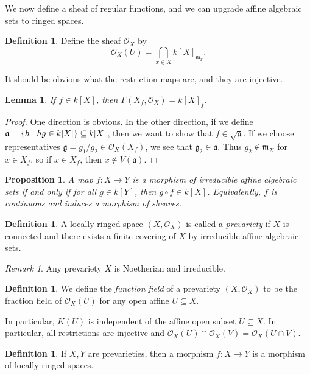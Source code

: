 \documentclass[leqno, openany]{memoir}
\newtheorem{prop}[thm]{Proposition}
\newtheorem{lem}[thm]{Lemma}
\theoremstyle{definition}
\newtheorem{defn}[thm]{Definition}
\theoremstyle{remark}
\newtheorem{rmk}[thm]{Remark}
\theoremstyle{plain}
\theoremstyle{definition}
\theoremstyle{remark}
\newcommand{\mf}[1]{\mathfrak{#1}}
\newcommand{\msc}[1]{\mathscr{#1}}
\begin{document}
We now define a sheaf of regular functions, and we can upgrade affine algebraic sets to ringed spaces.

\begin{defn}
    Define the sheaf $\msc{O}_X$ by
    \[ \msc{O}_X(U) = \bigcap_{x \in X} {k[X]}_{\mf{m}_x}. \]
\end{defn}
It should be obvious what the restriction maps are, and they are injective.

\begin{lem}
    If $f \in k[X]$, then $\Gamma(X_f, \msc{O}_X) = {k[X]}_f$.
\end{lem}

\begin{proof}
    One direction is obvious. In the other direction, if we define $\mf{a} = \qty{h \mid h g \in k[X]} \subseteq k[X]$, then we want to show that $f \in \sqrt{\mf{a}}$. If we choose representatives $\mf{g} = g_1 / g_2 \in \msc{O}_X(X_f)$, we see that $\mf{g}_2 \in \mf{a}$. Thus $g_2 \notin \mf{m}_X$ for $x \in X_f$, so if $x \in X_f$, then $x \notin V(\mf{a})$.
\end{proof}

\begin{prop}
    A map $f \colon X \to Y$ is a morphism of irreducible affine algebraic sets if and only if for all $g \in k[Y]$, then $g \circ f \in k[X]$. Equivalently, $f$ is continuous and induces a morphism of sheaves.
\end{prop}

\begin{defn}
    A locally ringed space $(X, \msc{O}_X)$ is called a \textit{prevariety} if $X$ is connected and there exists a finite covering of $X$ by irreducible affine algebraic sets.
\end{defn}

\begin{rmk}
    Any prevariety $X$ is Noetherian and irreducible.
\end{rmk}

\begin{defn}
    We define the \textit{function field} of a prevariety $(X, \msc{O}_X)$ to be the fraction field of $\msc{O}_X(U)$ for any open affine $U \subseteq X$.
\end{defn}

In particular, $K(U)$ is independent of the affine open subset $U \subseteq X$. In particular, all restrictions are injective and $\msc{O}_X(U) \cap \msc{O}_X(V) = \msc{O}_X(U \cap V)$.

\begin{defn}
    If $X, Y$ are prevarieties, then a morphism $f \colon X \to Y$ is a morphism of locally ringed spaces.
\end{defn}
\end{document}
